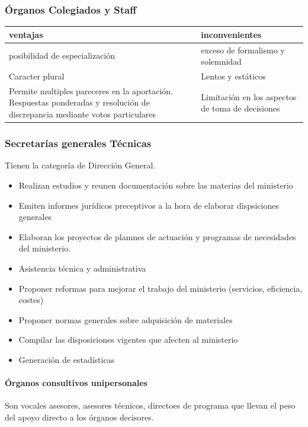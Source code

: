     \subsubsection{Órganos Colegiados y Staff}
    \begin{table}[H]
    \begin{tabular}{ll}
        ventajas & inconvenientes \\
        \midrule
        posibilidad de especialización & exceso de formalismo y solemnidad \\
        Caracter plural & Lentos y estáticos \\
        Permite multiples pareceres en la aportación. Respuestas ponderadas y resolución de discrepancia mediante votos particulares & Limitación en los aspectos de toma de decisiones \\
    \end{tabular}
    \end{table}

    \subsubsection{Secretarías generales Técnicas}
        Tienen la categoría de Dirección General.
        \begin{itemize}
            \item Realizan estudios y reunen documentación sobre las materias del ministerio
            \item Emiten informes jurídicos preceptivos a la hora de elaborar dispsiciones generales
            \item Elaboran los proyectos de plamnes de actuación y programas de necesidades del ministerio.
            \item Asistencia técnica y administrativa
            \item Proponer reformas para mejorar el trabajo del ministerio (servicios, eficiencia, costes)
            \item Proponer normas generales sobre adquisición de materiales
            \item Compilar las disposiciones vigentes que afecten al ministerio
            \item Generación de estadísticas
        \end{itemize}
        \paragraph{Órganos consultivos unipersonales}
            Son vocales asesores, asesores técnicos, directoes de programa que llevan el peso del apoyo directo a los órganos decisores. 
